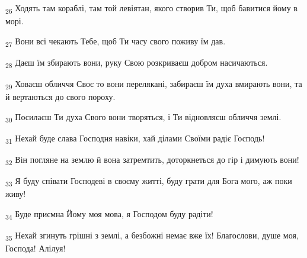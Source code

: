 \begin{tcolorbox}
\textsubscript{26} Ходять там кораблі, там той левіятан, якого створив Ти, щоб бавитися йому в морі.
\end{tcolorbox}
\begin{tcolorbox}
\textsubscript{27} Вони всі чекають Тебе, щоб Ти часу свого поживу їм дав.
\end{tcolorbox}
\begin{tcolorbox}
\textsubscript{28} Даєш їм збирають вони, руку Свою розкриваєш добром насичаються.
\end{tcolorbox}
\begin{tcolorbox}
\textsubscript{29} Ховаєш обличчя Своє то вони перелякані, забираєш їм духа вмирають вони, та й вертаються до свого пороху.
\end{tcolorbox}
\begin{tcolorbox}
\textsubscript{30} Посилаєш Ти духа Свого вони творяться, і Ти відновляєш обличчя землі.
\end{tcolorbox}
\begin{tcolorbox}
\textsubscript{31} Нехай буде слава Господня навіки, хай ділами Своїми радіє Господь!
\end{tcolorbox}
\begin{tcolorbox}
\textsubscript{32} Він погляне на землю й вона затремтить, доторкнеться до гір і димують вони!
\end{tcolorbox}
\begin{tcolorbox}
\textsubscript{33} Я буду співати Господеві в своєму житті, буду грати для Бога мого, аж поки живу!
\end{tcolorbox}
\begin{tcolorbox}
\textsubscript{34} Буде приємна Йому моя мова, я Господом буду радіти!
\end{tcolorbox}
\begin{tcolorbox}
\textsubscript{35} Нехай згинуть грішні з землі, а безбожні немає вже їх! Благослови, душе моя, Господа! Алілуя!
\end{tcolorbox}
